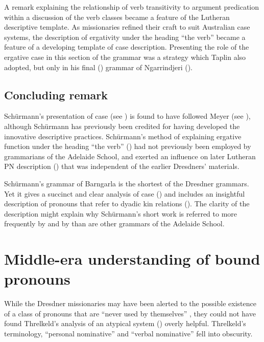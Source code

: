 A remark explaining the relationship of verb transitivity to argument predication within a discussion of the verb classes became a feature of the Lutheran descriptive template. As missionaries refined their craft to suit Australian case systems, the description of ergativity under the heading “the verb” became a feature of a developing template of case description. Presenting the role of the ergative case in this section of the grammar was a strategy which Taplin also adopted, but only in his final (\citeyear{taplin_grammar_1878}) grammar of Ngarrindjeri ().

\subsection{Concluding remark}
\label{sec:key:6.2.2}
\largerpage
Schürmann’s presentation of case (see ) is found to have followed Meyer (see ), although Schürmann has previously been credited for having developed the innovative descriptive practices. Schürmann’s method of explaining ergative function under the heading “the verb” () had not previously been employed by grammarians of the Adelaide School, and exerted an influence on later Lutheran PN description () that was independent of the earlier Dresdners' materials.

Schürmann’s grammar of Barngarla is the shortest of the Dresdner grammars. Yet it gives a succinct and clear analysis of case () and includes an insightful description of pronouns that refer to dyadic kin relations (). The clarity of the description might explain why Schürmann’s short work is referred to more frequently by \citet{ray_aboriginal_1925} and by \citet{elkin_nature_1937} than are other grammars of the Adelaide School.

\section{Middle-era understanding of bound pronouns}
\label{sec:key:6.3}\label{bkm:Ref73553541}
\largerpage

While the Dresdner missionaries may have been alerted to the possible existence of a class of pronouns that are “never used by themselves” \citep[18]{threlkeld_australian_1834}, they could not have found Threlkeld’s analysis of an atypical system () overly helpful. Threlkeld’s terminology, “personal nominative” and “verbal nominative” fell into obscurity.

